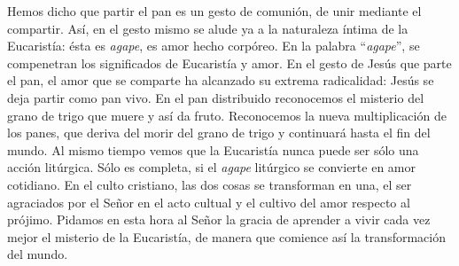 			\begin{body}Hemos dicho que partir el pan es un gesto de comunión, de unir mediante el compartir. Así, en el gesto mismo se alude ya a la naturaleza íntima de la Eucaristía: ésta es \textit{agape}, es amor hecho corpóreo. En la palabra “\textit{agape}”,\textit{ }se compenetran los significados de Eucaristía y amor. En el gesto de Jesús que parte el pan, el amor que se comparte ha alcanzado su extrema radicalidad: Jesús se deja partir como pan vivo. En el pan distribuido reconocemos el misterio del grano de trigo que muere y así da fruto. Reconocemos la nueva multiplicación de los panes, que deriva del morir del grano de trigo y continuará hasta el fin del mundo. Al mismo tiempo vemos que la Eucaristía nunca puede ser sólo una acción litúrgica. Sólo es completa, si el \textit{agape} litúrgico se convierte en amor cotidiano. En el culto cristiano, las dos cosas se transforman en una, el ser agraciados por el Señor en el acto cultual y el cultivo del amor respecto al prójimo. Pidamos en esta hora al Señor la gracia de aprender a vivir cada vez mejor el misterio de la Eucaristía, de manera que comience así la transformación del mundo.\end{body}
			
